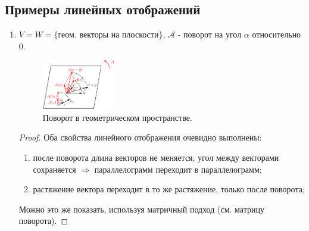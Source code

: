 \documentclass[12pt]{article}
\newcommand{\MA}{\mathcal{A}}
\theoremstyle{definition}
\begin{document}
\subsection*{Примеры линейных отображений}
\begin{enumerate}[label=(\arabic*)]
	\item $V = W = \{\text{геом. векторы на плоскости}\}$, $\MA$ - поворот на угол $\alpha$ относительно $0$.
	\begin{figure}[H]
		\centering
		\includegraphics[width=0.3\textwidth]{AL1L5_1.eps}
		\caption{Поворот в геометрическом пространстве.}
		\label{5_1}
	\end{figure}
	\begin{proof} Оба свойства линейного отображения очевидно выполнены:
		\begin{enumerate}[label=\arabic*)]
			\item после поворота длина векторов не меняется, угол между векторами сохраняется $\Rightarrow$ параллелограмм переходит в параллелограмм;
			\item растяжение вектора переходит в то же растяжение, только после поворота;
		\end{enumerate}
		Можно это же показать, используя матричный подход (см. матрицу поворота).
	\end{proof}


\end{enumerate}
\end{document}
